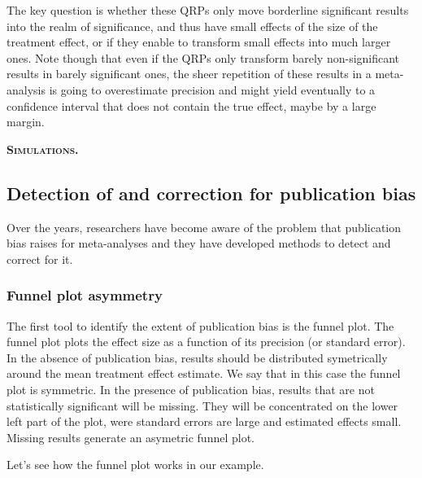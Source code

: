 \documentclass[]{book}
\theoremstyle{definition}
\theoremstyle{definition}
\theoremstyle{definition}
\theoremstyle{remark}
\let\BeginKnitrBlock\begin \let\EndKnitrBlock\end
\begin{document}
The key question is whether these QRPs only move borderline significant results into the realm of significance, and thus have small effects of the size of the treatment effect, or if they enable to transform small effects into much larger ones.
Note though that even if the QRPs only transform barely non-significant results in barely significant ones, the sheer repetition of these results in a meta-analysis is going to overestimate precision and might yield eventually to a confidence interval that does not contain the true effect, maybe by a large margin.

\textbf{\textsc{Simulations.}}

\hypertarget{detection-of-and-correction-for-publication-bias}{%
\subsection{Detection of and correction for publication bias}\label{detection-of-and-correction-for-publication-bias}}

Over the years, researchers have become aware of the problem that publication bias raises for meta-analyses and they have developed methods to detect and correct for it.

\hypertarget{funnel-plot-asymmetry}{%
\subsubsection{Funnel plot asymmetry}\label{funnel-plot-asymmetry}}

The first tool to identify the extent of publication bias is the funnel plot.
The funnel plot plots the effect size as a function of its precision (or standard error).
In the absence of publication bias, results should be distributed symetrically around the mean treatment effect estimate.
We say that in this case the funnel plot is symmetric.
In the presence of publication bias, results that are not statistically significant will be missing.
They will be concentrated on the lower left part of the plot, were standard errors are large and estimated effects small.
Missing results generate an asymetric funnel plot.

\BeginKnitrBlock{example}
\protect\hypertarget{exm:unnamed-chunk-165}{}{\label{exm:unnamed-chunk-165} }Let's see how the funnel plot works in our example.
\EndKnitrBlock{example}
\end{document}

